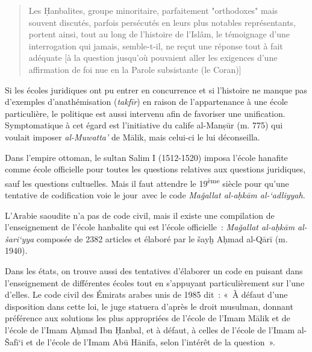 \begin{quote}
    Les Ḥanbalites, groupe minoritaire, parfaitement "orthodoxes" mais souvent discutés, parfois persécutés en leurs plus notables représentants, portent ainsi, tout au long de l'histoire de l'Islâm, le témoignage d'une interrogation qui jamais, semble-t-il, ne reçut une réponse tout  à fait adéquate [à la question jusqu'où pouvaient aller les exigences d'une affirmation de foi nue en la Parole subsistante (le Coran)] 
\end{quote}
  

Si les écoles juridiques ont pu entrer en concurrence et si l'histoire
ne manque pas d'exemples d'anathémisation (\emph{takfīr}) en raison de
l'appartenance à une école particulière, le politique est aussi
intervenu afin de favoriser une unification. Symptomatique à cet égard
est l'initiative du calife al-Manṣūr (m. 775) qui voulait imposer
\emph{al-Muwatta'} de Mālik, mais celui-ci le lui déconseilla.

Dans l'empire ottoman, le sultan Salim I (1512-1520) imposa l'école
hanafite comme école officielle pour toutes les questions relatives aux
questions juridiques, sauf les questions cultuelles. Mais il faut
attendre le 19\textsuperscript{ème} siècle pour qu'une tentative de
codification voie le jour~avec le code \emph{Maǧallat al-aḥkām
al-`adliyyah}.

L'Arabie saoudite n'a pas de code civil, mais il existe une compilation
de l'enseignement de l'école hanbalite qui est l'école officielle~:
\emph{Maǧallat al-aḥkām al-šari`yya} composée de 2382 articles et
élaboré par le šayḫ Aḥmad al-Qārī (m. 1940).

Dans les états, on trouve aussi des tentatives d'élaborer un code en
puisant dans l'enseignement de différentes écoles tout en s'appuyant
particulièrement sur l'une d'elles. Le code civil des Émirats arabes
unis de 1985 dit~: «~À défaut d'une disposition dans cette loi, le juge
statuera d'après le droit musulman, donnant préférence aux solutions les
plus appropriées de l'école de l'Imam Mālik et de l'école de l'Imam
Aḥmad Ibn Ḥanbal, et à défaut, à celles de l'école de l'Imam al-Šafī`i
et de l'école de l'Imam Abū Hānifa, selon l'intérêt de la question~».

